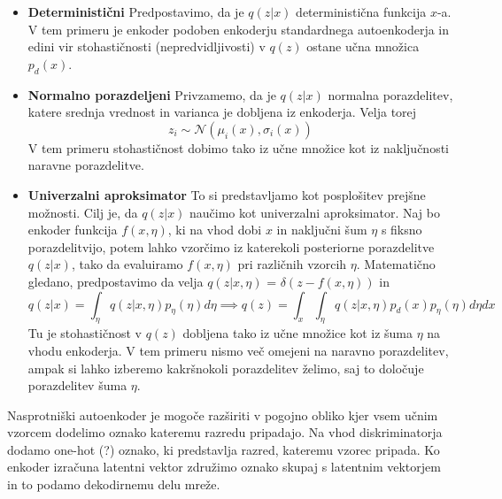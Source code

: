 \documentclass[12pt,a4paper,twoside]{article}
\theoremstyle{definition} %
\theoremstyle{plain} %
\numberwithin{equation}{section}  %
\begin{document}
\begin{itemize}
\item \textbf{Deterministični} Predpostavimo, da je $q(z|x)$ deterministična funkcija $x$-a. V tem primeru je enkoder podoben enkoderju standardnega autoenkoderja in edini vir stohastičnosti (nepredvidljivosti)  v $q(z)$ ostane učna množica $p_d(x)$.
\item \textbf{Normalno porazdeljeni} Privzamemo, da je $q(z|x)$ normalna porazdelitev, katere srednja vrednost in varianca je dobljena iz enkoderja. Velja torej $$z_i \sim \mathcal{N}(\mu_i(x),\sigma_i(x))$$ V tem primeru stohastičnost dobimo tako iz učne množice kot iz naključnosti naravne porazdelitve.
\item \textbf{Univerzalni aproksimator} To si predstavljamo kot posplošitev prejšne možnosti. Cilj je, da  $q(z|x)$ naučimo kot univerzalni aproksimator. Naj bo enkoder funkcija $f(x,\eta)$, ki na vhod dobi $x$ in  naključni šum $\eta$ s fiksno porazdelitvijo, potem lahko vzorčimo iz katerekoli posteriorne porazdelitve $q(z|x)$, tako da evaluiramo $f(x,\eta)$ pri različnih vzorcih 
$\eta$. Matematično gledano, predpostavimo da velja $q(z|x,\eta)$ = $\delta(z-f(x,\eta))$ in 
$$q(z|x) = \int_{\eta} q(z|x,\eta)p_\eta(\eta)d \eta \implies q(z) = \int_x \int_{\eta} q(z|x,\eta)p_{d}(x)p_{\eta}(\eta)d \eta dx $$ 
Tu je stohastičnost  v $q(z)$ dobljena tako iz učne množice kot iz šuma $\eta$ na vhodu enkoderja. V tem primeru nismo več omejeni na naravno porazdelitev, ampak si lahko izberemo kakršnokoli porazdelitev želimo, saj to določuje porazdelitev šuma $\eta$. 
\end{itemize}

Nasprotniški autoenkoder je mogoče razširiti v pogojno obliko kjer vsem učnim vzorcem dodelimo oznako kateremu razredu pripadajo. 
Na vhod diskriminatorja dodamo one-hot (?) oznako, ki predstavlja razred, kateremu vzorec pripada. 
Ko enkoder izračuna latentni vektor združimo oznako skupaj s latentnim vektorjem in to podamo dekodirnemu delu mreže. 



  
\end{document}
